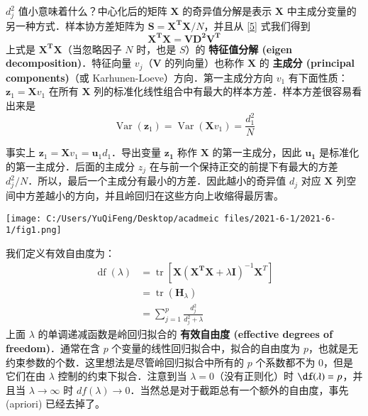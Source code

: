 \documentclass[
  15pt,
  ignorenonframetext,
]{beamer}
\begin{document}
\begin{frame}
\(d_j^2\) 值小意味着什么？中心化后的矩阵 \(\mathbf{X}\)
的奇异值分解是表示 \(\mathbf{X}\)
中主成分变量的另一种方式．样本协方差矩阵为 \(\mathbf{S=X^TX}/N\)，并且从
\eqref{5} 式我们得到 \[
\mathbf{X^T X = VD^2V^T}\tag{8}
\] 上式是 \(\mathbf{X^TX}\)（当忽略因子 \(N\) 时，也是 \(S\)）的
\textbf{特征值分解 (eigen decomposition)}．特征向量
\(v_j\)（\(\mathbf{V}\) 的列向量）也称作 \(\mathbf{X}\) 的
\textbf{主成分 (principal components)}（或
Karhunen-Loeve）方向．第一主成分方向 \(v_1\)
有下面性质：\(\mathbf{z}_1=\mathbf{X}v_1\) 在所有 \(\mathbf{X}\)
列的标准化线性组合中有最大的样本方差．样本方差很容易看出来是 \[
\operatorname{Var}\left(\mathbf{z}_{1}\right)=\operatorname{Var}\left(\mathbf{X} v_{1}\right)=\frac{d_{1}^{2}}{N}
\tag{9}
\]
\end{frame}

\begin{frame}
事实上 \(\mathbf{z}_1=\mathbf{X}v_1=\mathbf{u}_1d_1\)．导出变量
\(\mathbf{z_1}\) 称作 \(\mathbf{X}\) 的第一主成分，因此 \(\mathbf{u_1}\)
是标准化的第一主成分．后面的主成分 \(z_j\)
在与前一个保持正交的前提下有最大的方差
\(d_j^2/N\)．所以，最后一个主成分有最小的方差．因此越小的奇异值 \(d_j\)
对应 \(\mathbf{X}\)
列空间中方差越小的方向，并且岭回归在这些方向上收缩得最厉害。
\end{frame}

\begin{frame}
\texttt{[image: C:/Users/YuQiFeng/Desktop/acadmeic files/2021-6-1/2021-6-1/fig1.png]}
\end{frame}

\begin{frame}
我们定义有效自由度为： \[
\begin{aligned}
\operatorname{df}(\lambda) &=\operatorname{tr}\left[\mathbf{X}\left(\mathbf{X}^{\mathbf{T}} \mathbf{X}+\lambda \mathbf{I}\right)^{-1} \mathbf{X}^{T}\right] \\
&=\operatorname{tr}\left(\mathbf{H}_{\lambda}\right) \\
&=\sum_{j=1}^{p} \frac{d_{j}^{2}}{d_{j}^{2}+\lambda}
\end{aligned}
\tag{10}
\] 上面 \(\lambda\) 的单调递减函数是岭回归拟合的 \textbf{有效自由度
(effective degrees of freedom)}．通常在含 \(p\)
个变量的线性回归拟合中，拟合的自由度为
\(p\)，也就是无约束参数的个数．这里想法是尽管岭回归拟合中所有的 \(p\)
个系数都不为 0，但是它们在由 \(\lambda\) 控制的约束下拟合．注意到当
\(\lambda=0\)（没有正则化）时 \(\df(\lambda)=p\)，并且当
\(\lambda\rightarrow \infty\) 时
\(df(\lambda)\rightarrow 0\)．当然总是对于截距总有一个额外的自由度，事先
(apriori) 已经去掉了。
\end{frame}
\end{document}
